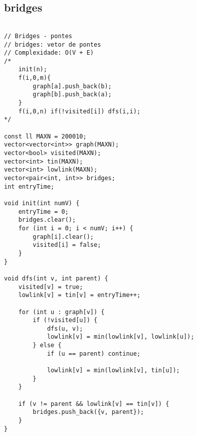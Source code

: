 \documentclass[landscape,twocolumn,10pt,a4paper]{article}
\begin{document}
\subsection{bridges}
\begin{verbatim}

// Bridges - pontes
// bridges: vetor de pontes
// Complexidade: O(V + E)
/*
    init(n);
    f(i,0,m){
        graph[a].push_back(b);
        graph[b].push_back(a);
    }
    f(i,0,n) if(!visited[i]) dfs(i,i);
*/

const ll MAXN = 200010;
vector<vector<int>> graph(MAXN);
vector<bool> visited(MAXN);
vector<int> tin(MAXN);
vector<int> lowlink(MAXN);
vector<pair<int, int>> bridges;
int entryTime;

void init(int numV) {
    entryTime = 0;
    bridges.clear();
    for (int i = 0; i < numV; i++) {
        graph[i].clear();
        visited[i] = false;
    }
}

void dfs(int v, int parent) {
    visited[v] = true;
    lowlink[v] = tin[v] = entryTime++;

    for (int u : graph[v]) {
        if (!visited[u]) {
            dfs(u, v);
            lowlink[v] = min(lowlink[v], lowlink[u]);
        } else {
            if (u == parent) continue;

            lowlink[v] = min(lowlink[v], tin[u]);
        }
    }

    if (v != parent && lowlink[v] == tin[v]) {
        bridges.push_back({v, parent});
    }
}


\end{verbatim}
\end{document}
